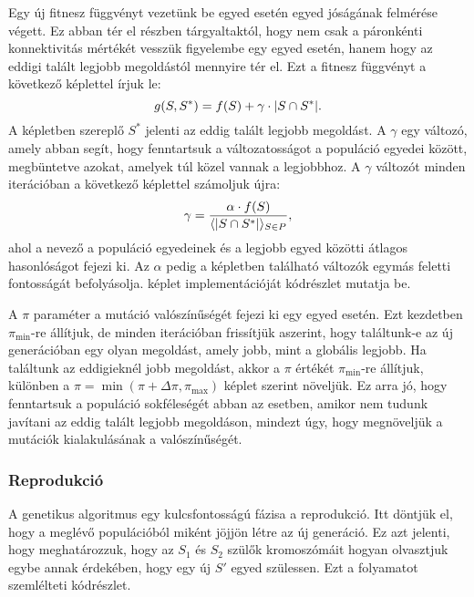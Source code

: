 Egy új fitnesz függvényt vezetünk be  egyed esetén egyed jóságának felmérése végett.
Ez abban tér el  részben tárgyaltaktól,
hogy nem csak a páronkénti konnektivitás mértékét vesszük figyelembe egy egyed esetén,
hanem hogy az eddigi talált legjobb megoldástól mennyire tér el.
Ezt a fitnesz függvényt a következő képlettel írjuk le:
\begin{equation}\label{eqn:SOCNDP_GA_FITNESZ_FUNCTION}
  g(S, S^{*}) = f(S) + \gamma \cdot \lvert S \cap S^{*}\rvert.
\end{equation}
A képletben szereplő $S^{*}$ jelenti az eddig talált legjobb megoldást.
A $\gamma$ egy változó, amely abban segít, hogy fenntartsuk a változatosságot a populáció egyedei között,
megbüntetve azokat, amelyek túl közel vannak a legjobbhoz.
A $\gamma$ változót minden iterációban a következő képlettel számoljuk újra:
\begin{equation}\label{eqn:SOCNDP_GA_GAMMA}
  \gamma = \frac{\alpha \cdot f(S)}{\langle \lvert S \cap S^{*}\rvert \rangle_{S \in P}},
\end{equation}
ahol a nevező a populáció egyedeinek és a legjobb egyed közötti átlagos hasonlóságot fejezi ki.
Az $\alpha$ pedig a képletben található változók egymás feletti fontosságát befolyásolja.
 képlet implementációját  kódrészlet mutatja be.


A $\pi$ paraméter a mutáció valószínűségét fejezi ki egy egyed esetén.
Ezt kezdetben $\pi_{\min}$-re állítjuk, de minden iterációban frissítjük aszerint,
hogy találtunk-e az új generációban egy olyan megoldást, amely jobb, mint a globális legjobb.
Ha találtunk az eddigieknél jobb megoldást, akkor a $\pi$ értékét $\pi_{\min}$-re állítjuk,
különben a $\pi = \min \left(\pi + \Delta \pi, \pi_{\max} \right)$ képlet szerint növeljük.
Ez arra jó, hogy fenntartsuk a populáció sokféleségét abban az esetben,
amikor nem tudunk javítani az eddig talált legjobb megoldáson,
mindezt úgy, hogy megnöveljük a mutációk kialakulásának a valószínűségét.


\subsubsection{Reprodukció}
A genetikus algoritmus egy kulcsfontosságú fázisa a reprodukció.
Itt döntjük el, hogy a meglévő populációból miként jöjjön létre az új generáció.
Ez azt jelenti, hogy meghatározzuk, hogy az $S_{1}$ és $S_{2}$ szülők kromoszómáit
hogyan olvasztjuk egybe annak érdekében, hogy egy új $S'$ egyed szülessen.
Ezt a folyamatot szemlélteti  kódrészlet.


